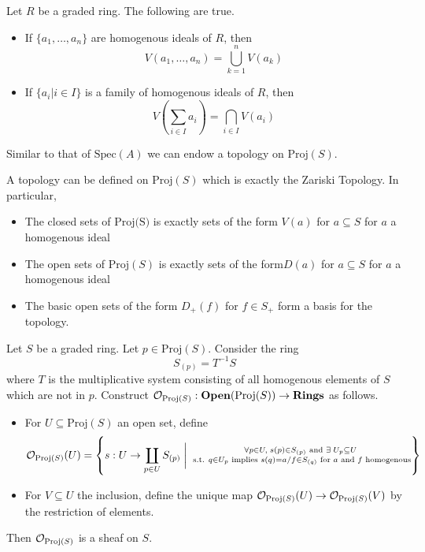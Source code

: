 \documentclass[a4paper]{article}
\begin{document}
\begin{prp}{}{} Let $R$ be a graded ring. The following are true. 
\begin{itemize}
\item If $\{a_1,\dots,a_n\}$ are homogenous ideals of $R$, then $$V(a_1,\dots,a_n)=\bigcup_{k=1}^nV(a_k)$$
\item If $\{a_i|i\in I\}$ is a family of homogenous ideals of $R$, then $$V\left(\sum_{i\in I}a_i\right)=\bigcap_{i\in I}V(a_i)$$
\end{itemize}
\end{prp}

Similar to that of $\text{Spec}(A)$ we can endow a topology on $\text{Proj}(S)$. 

\begin{thm}{}{} A topology can be defined on $\text{Proj}(S)$ which is exactly the Zariski Topology. In particular, 
\begin{itemize}
\item The closed sets of $\text{Proj(S)}$ is exactly sets of the form $V(a)$ for $a\subseteq S$ for $a$ a homogenous ideal
\item The open sets of $\text{Proj}(S)$ is exactly sets of the form$ D(a)$ for $a\subseteq S$ for $a$ a homogenous ideal
\item The basic open sets of the form $D_+(f)$ for $f\in S_+$ form a basis for the topology. 
\end{itemize}
\end{thm}

\begin{thm}{}{} Let $S$ be a graded ring. Let $p\in\text{Proj}(S)$. Consider the ring $$S_{(p)}=T^{-1}S$$ where $T$ is the multiplicative system consisting of all homogenous elements of $S$ which are not in $p$. Construct $\mathcal{O}_{\text{Proj}(S)}:\bold{Open}(\text{Proj}(S))\to\bold{Rings}$ as follows. 
\begin{itemize}
\item For $U\subseteq\text{Proj}(S)$ an open set, define $$\mathcal{O}_{\text{Proj}(S)}(U)=\left\{s:U\to\coprod_{p\in U}S_{(p)}\;\bigg{|}\;\substack{\forall p\in U,\;s(p)\in S_{(p)}\text{ and }\exists\;U_p\subseteq U\\\text{ s.t. }q\in U_p\text{ implies }s(q)=a/f\in S_{(q)}\text{ for }a\text{ and }f\text{ homogenous}}\right\}$$
\item For $V\subseteq U$ the inclusion, define the unique map $\mathcal{O}_{\text{Proj}(S)}(U)\to\mathcal{O}_{\text{Proj}(S)}(V)$ by the restriction of elements. 
\end{itemize}
Then $\mathcal{O}_{\text{Proj}(S)}$ is a sheaf on $S$. 
\end{thm}
\end{document}
